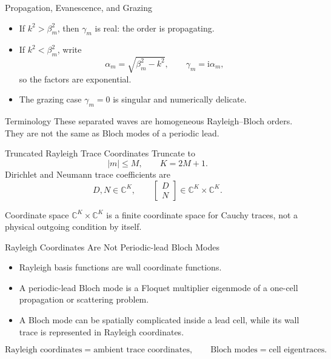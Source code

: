 \documentclass[aspectratio=169]{beamer}
\newcommand{\ii}{\mathrm{i}}
\begin{document}
\begin{frame}{Propagation, Evanescence, and Grazing}
  \begin{itemize}
    \item If \(k^2>\beta_m^2\), then \(\gamma_m\) is real:
    the order is propagating.
    \item If \(k^2<\beta_m^2\), write
    \[
      \alpha_m=\sqrt{\beta_m^2-k^2},
      \qquad
      \gamma_m=\ii\alpha_m,
    \]
    so the factors are exponential.
    \item The grazing case \(\gamma_m=0\) is singular and numerically delicate.
  \end{itemize}
  \begin{alertblock}{Terminology}
    These separated waves are homogeneous Rayleigh--Bloch orders.  They are
    not the same as Bloch modes of a periodic lead.
  \end{alertblock}
\end{frame}


\begin{frame}{Truncated Rayleigh Trace Coordinates}
  Truncate to
  \[
    |m|\le M,
    \qquad
    K=2M+1.
  \]
  Dirichlet and Neumann trace coefficients are
  \[
    D,N\in\mathbb C^K,
    \qquad
    \begin{bmatrix}D\\N\end{bmatrix}
    \in
    \mathbb C^K\times\mathbb C^K.
  \]
  \begin{block}{Coordinate space}
    \(\mathbb C^K\times\mathbb C^K\) is a finite coordinate space for Cauchy
    traces, not a physical outgoing condition by itself.
  \end{block}
\end{frame}

\begin{frame}{Rayleigh Coordinates Are Not Periodic-lead Bloch Modes}
  \begin{itemize}
    \item Rayleigh basis functions are wall coordinate functions.
    \item A periodic-lead Bloch mode is a Floquet multiplier eigenmode of a
    one-cell propagation or scattering problem.
    \item A Bloch mode can be spatially complicated inside a lead cell, while
    its wall trace is represented in Rayleigh coordinates.
  \end{itemize}
  \[
    \text{Rayleigh coordinates}
    =
    \text{ambient trace coordinates},
    \qquad
    \text{Bloch modes}
    =
    \text{cell eigentraces}.
  \]
\end{frame}
\end{document}
